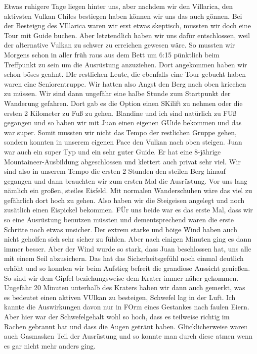 \documentclass[11pt]{book}
\begin{document}
Etwas ruhigere Tage liegen hinter uns, aber nachdem wir den Villarica, den aktivsten Vulkan Chiles bestiegen haben können wir uns 
das auch gönnen. Bei der Besteigng des VIllarica waren wir erst etwas skeptisch, mussten wir doch eine Tour mit Guide buchen. Aber 
letztendlich haben wir uns dafür entschlossen, weil der alternative Vulkan zu schwer zu erreichen gewesen wäre. So mussten wir Morgens 
schon in aller früh raus aus dem Bett um 6:15 pünktlich beim Treffpunkt zu sein um die Ausrüstung anzuziehen. Dort angekommen haben 
wir schon böses geahnt. DIe restlichen Leute, die ebenfalls eine Tour gebucht haben waren eine Seniorentruppe. Wir hatten also Angst 
den Berg nach oben kriechen zu müssen. Wir sind dann ungefähr eine halbe Stunde zum Startpunkt der Wanderung gefahren. Dort gab es 
die Option einen SKilift zu nehmen oder die ersten 2 Kilometer zu Fuß zu gehen. Blandine und ich sind natürlich zu FUß gegangen und so 
haben wir mit Juan einen eigenen GUide bekommen und das war super. Somit mussten wir nicht das Tempo der restlichen Gruppe gehen, sondern 
konnten in unserem eigenen Pace den Vulkan nach oben steigen. Juan war auch ein super Typ und ein sehr guter Guide. Er hat eine 8-jährige 
Mountaineer-Ausbildung abgeschlossen und klettert auch privat sehr viel. Wir sind also in unserem Tempo die ersten 2 Stunden den steilen 
Berg hinauf gegangen und dann brauchten wir zum ersten Mal die Ausrüstung. Vor uns lang nämlich ein großen, steiles Eisfeld. Mit 
normalen Wanderschuhen wäre das viel zu gefährlich dort hoch zu gehen. Also haben wir die Steigeisen angelegt und noch zusätlich 
einen Eispickel bekommen. FÜr uns beide war es das erste Mal, dass wir so eine Ausrüstung benutzen müssten und dementsprechend waren 
die erste Schritte noch etwas unsicher. Der extrem starke und böige Wind haben auch nicht geholfen sich sehr sicher zu fühlen. Aber nach 
einigen Minuten ging es dann immer besser. Aber der Wind wurde so stark, dass Juan beschlossen hat, uns alle mit einem Seil abzusichern. 
Das hat das Sicherheitsgefühl noch einmal deutlich erhöht und so konnten wir beim Aufstieg befreit die grandiose Aussicht genießen. So sind 
wir dem Gipfel beziehungsweise dem Krater immer näher gekommen. Ungefähr 20 Minuten unterhalb des Kraters haben wir dann auch gemerkt, was es 
bedeutet einen aktiven VUlkan zu besteigen, Schwefel lag in der Luft. Ich kannte die Auswirkungen davon nur in FOrm eines Gestankes nach 
faulen Eiern. Aber hier war der Schwefelgehalt wohl so hoch, dass es teilweise richtig im Rachen gebrannt hat und dass die Augen getränt haben. 
Glücklicherweise waren auch Gasmasken Teil der Ausrüstung und so konnte man durch diese atmen wenn es gar nicht mehr anders ging. 
\end{document}
